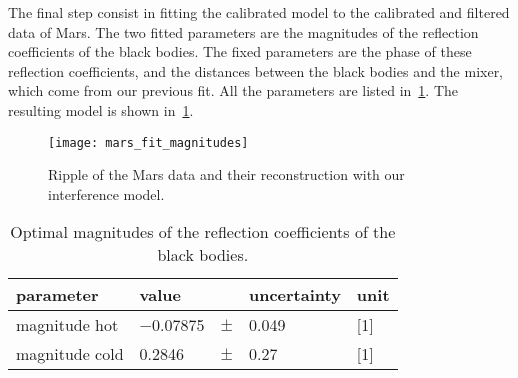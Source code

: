 
%
The final step consist in fitting the calibrated model to the calibrated and filtered data of Mars.
The two fitted parameters are the magnitudes of the reflection coefficients of the black bodies.
The fixed parameters are the phase of these reflection coefficients, and the distances between the black bodies and the mixer, which come from our previous fit.
All the parameters are listed in~\cref{tab:mars_amplitudes_fit}.
The resulting model is shown in~\cref{fig:mars_fit_magnitudes}.
\begin{figure}[hbtp]
    \centering
    \texttt{[image: mars\_fit\_magnitudes]}
    \caption{Ripple of the Mars data and their reconstruction with our interference model.}
    \label{fig:mars_fit_magnitudes}
\end{figure}
\begin{table}[hbtp]
    \centering
    \begin{tabular}{llcll}
        \toprule
        parameter & \multicolumn{1}{l}{value} & & \multicolumn{1}{l}{uncertainty} & unit \\
        \midrule
        magnitude hot  &              \num{-0.07875} & $\pm$ & \num{0.049} & [1] \\
        magnitude cold & \phantom{$-$}\num{ 0.2846 } & $\pm$ & \num{0.27} & [1] \\
        \bottomrule
    \end{tabular}
    \caption{Optimal magnitudes of the reflection coefficients of the black bodies.}
    \label{tab:mars_amplitudes_fit}
\end{table}

